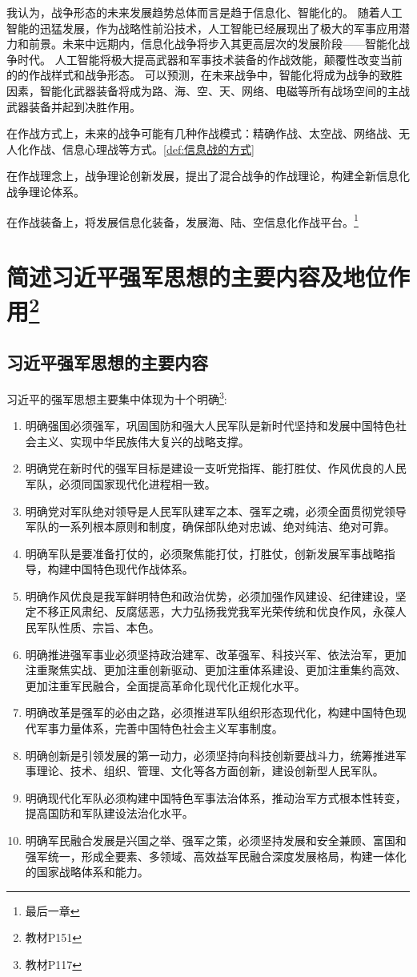 \documentclass[lang=cn,newtx,12pt,scheme=chinese]{elegantbook}
\begin{document}
我认为，战争形态的未来发展趋势总体而言是趋于信息化、智能化的。
随着人工智能的迅猛发展，作为战略性前沿技术，人工智能已经展现出了极大的军事应用潜力和前景。未来中远期内，信息化战争将步入其更高层次的发展阶段——智能化战争时代。
人工智能将极大提高武器和军事技术装备的作战效能，颠覆性改变当前的的作战样式和战争形态。
可以预测，在未来战争中，智能化将成为战争的致胜因素，智能化武器装备将成为路、海、空、天、网络、电磁等所有战场空间的主战武器装备并起到决胜作用。

在作战方式上，未来的战争可能有几种作战模式：精确作战、太空战、网络战、无人化作战、信息心理战等方式。\ref{def:信息战的方式}

在作战理念上，战争理论创新发展，提出了混合战争的作战理论，构建全新信息化战争理论体系。

在作战装备上，将发展信息化装备，发展海、陆、空信息化作战平台。\footnote{最后一章}

\chapter{简述习近平强军思想的主要内容及地位作用\footnote{教材P151}}
\section{习近平强军思想的主要内容}
习近平的强军思想主要集中体现为十个明确\footnote{教材P117}:

\begin{enumerate}
  \item 明确强国必须强军，巩固国防和强大人民军队是新时代坚持和发展中国特色社会主义、实现中华民族伟大复兴的战略支撑。
  \item 明确党在新时代的强军目标是建设一支听党指挥、能打胜仗、作风优良的人民军队，必须同国家现代化进程相一致。
  \item 明确党对军队绝对领导是人民军队建军之本、强军之魂，必须全面贯彻党领导军队的一系列根本原则和制度，确保部队绝对忠诚、绝对纯洁、绝对可靠。
  \item 明确军队是要准备打仗的，必须聚焦能打仗，打胜仗，创新发展军事战略指导，构建中国特色现代作战体系。
  \item 明确作风优良是我军鲜明特色和政治优势，必须加强作风建设、纪律建设，坚定不移正风肃纪、反腐惩恶，大力弘扬我党我军光荣传统和优良作风，永葆人民军队性质、宗旨、本色。
  \item 明确推进强军事业必须坚持政治建军、改革强军、科技兴军、依法治军，更加注重聚焦实战、更加注重创新驱动、更加注重体系建设、更加注重集约高效、更加注重军民融合，全面提高革命化现代化正规化水平。
  \item 明确改革是强军的必由之路，必须推进军队组织形态现代化，构建中国特色现代军事力量体系，完善中国特色社会主义军事制度。
  \item 明确创新是引领发展的第一动力，必须坚持向科技创新要战斗力，统筹推进军事理论、技术、组织、管理、文化等各方面创新，建设创新型人民军队。
  \item 明确现代化军队必须构建中国特色军事法治体系，推动治军方式根本性转变，提高国防和军队建设法治化水平。
  \item 明确军民融合发展是兴国之举、强军之策，必须坚持发展和安全兼顾、富国和强军统一，形成全要素、多领域、高效益军民融合深度发展格局，构建一体化的国家战略体系和能力。
\end{enumerate}
\end{document}
